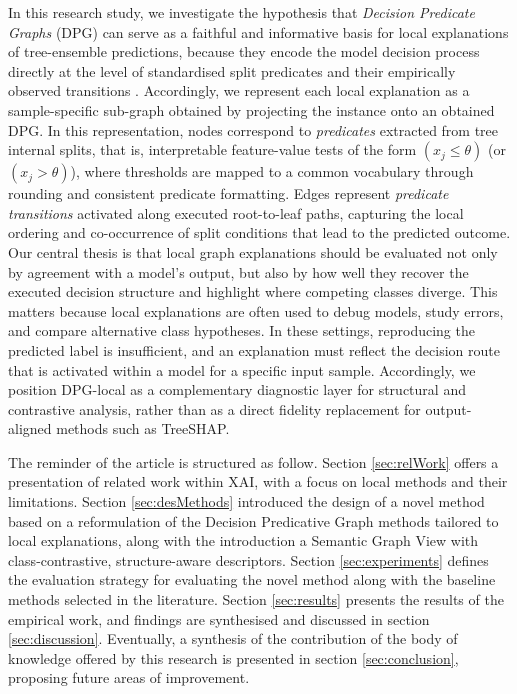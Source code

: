 \documentclass[runningheads]{llncs}
\begin{document}
In this research study, we investigate the hypothesis that \emph{Decision Predicate Graphs} (DPG) can serve as a faithful and informative basis for local explanations of tree-ensemble predictions, because they encode the model decision process directly at the level of standardised split predicates and their empirically observed transitions \cite{arrighi2024decision}. 
Accordingly, we represent each local explanation as a sample-specific sub-graph obtained by projecting the instance onto an obtained DPG. 
In this representation, nodes correspond to \emph{predicates} extracted from tree internal splits, that is, interpretable feature-value tests of the form $(x_j \leq \theta)$ (or $(x_j > \theta)$), where thresholds are mapped to a common vocabulary through rounding and consistent predicate formatting. 
Edges represent \emph{predicate transitions} activated along executed root-to-leaf paths, capturing the local ordering and co-occurrence of split conditions that lead to the predicted outcome. 
Our central thesis is that local graph explanations should be evaluated not only by agreement with a model's output, but also by how well they recover the executed decision structure and highlight where competing classes diverge. 
This matters because local explanations are often used to debug models, study errors, and compare alternative class hypotheses. 
In these settings, reproducing the predicted label is insufficient, and an explanation must reflect the decision route that is activated within a model for a specific input sample.
Accordingly, we position DPG-local as a complementary diagnostic layer for structural and contrastive analysis, rather than as a direct fidelity replacement for output-aligned methods such as TreeSHAP.

The reminder of the article is structured as follow.
Section \ref{sec:relWork} offers a presentation of related work within XAI, with a focus on local methods and their limitations.
Section \ref{sec:desMethods} introduced the design of a novel method based on a reformulation of the Decision Predicative Graph methods tailored to local explanations, along with the introduction a Semantic Graph View with class-contrastive, structure-aware descriptors. 
Section \ref{sec:experiments} defines the evaluation strategy for evaluating the novel method along with the baseline methods selected in the literature.
Section \ref{sec:results} presents the results of the empirical work, and findings are synthesised and discussed in section \ref{sec:discussion}.
Eventually, a synthesis of the contribution of the body of knowledge offered by this research is presented in section \ref{sec:conclusion}, proposing future areas of improvement.
\end{document}
